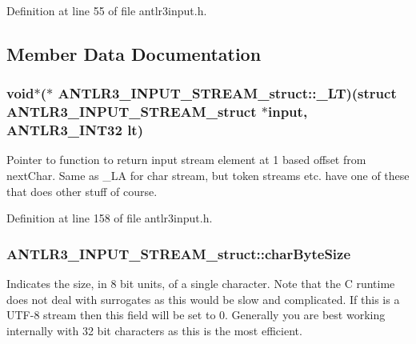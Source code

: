 Definition at line 55 of file antlr3input.\-h.



\subsection{Member Data Documentation}
\hypertarget{struct_a_n_t_l_r3___i_n_p_u_t___s_t_r_e_a_m__struct_a20b41f8c004bb0183ed4c7f9bb6502aa}{
\subsubsection[{\-\_\-\-L\-T}]{\setlength{\rightskip}{0pt plus 5cm}void$\ast$($\ast$ A\-N\-T\-L\-R3\-\_\-\-I\-N\-P\-U\-T\-\_\-\-S\-T\-R\-E\-A\-M\-\_\-struct\-::\-\_\-\-L\-T)(struct {\bf A\-N\-T\-L\-R3\-\_\-\-I\-N\-P\-U\-T\-\_\-\-S\-T\-R\-E\-A\-M\-\_\-struct} $\ast$input, {\bf A\-N\-T\-L\-R3\-\_\-\-I\-N\-T32} lt)}}\label{struct_a_n_t_l_r3___i_n_p_u_t___s_t_r_e_a_m__struct_a20b41f8c004bb0183ed4c7f9bb6502aa}
Pointer to function to return input stream element at 1 based offset from next\-Char. Same as \-\_\-\-L\-A for char stream, but token streams etc. have one of these that does other stuff of course. 

Definition at line 158 of file antlr3input.\-h.

\hypertarget{struct_a_n_t_l_r3___i_n_p_u_t___s_t_r_e_a_m__struct_aaac6c588f4b1817939ff796074ff494b}{
\subsubsection[{char\-Byte\-Size}]{ A\-N\-T\-L\-R3\-\_\-\-I\-N\-P\-U\-T\-\_\-\-S\-T\-R\-E\-A\-M\-\_\-struct\-::char\-Byte\-Size}}\label{struct_a_n_t_l_r3___i_n_p_u_t___s_t_r_e_a_m__struct_aaac6c588f4b1817939ff796074ff494b}
Indicates the size, in 8 bit units, of a single character. Note that the C runtime does not deal with surrogates as this would be slow and complicated. If this is a U\-T\-F-\/8 stream then this field will be set to 0. Generally you are best working internally with 32 bit characters as this is the most efficient. 

